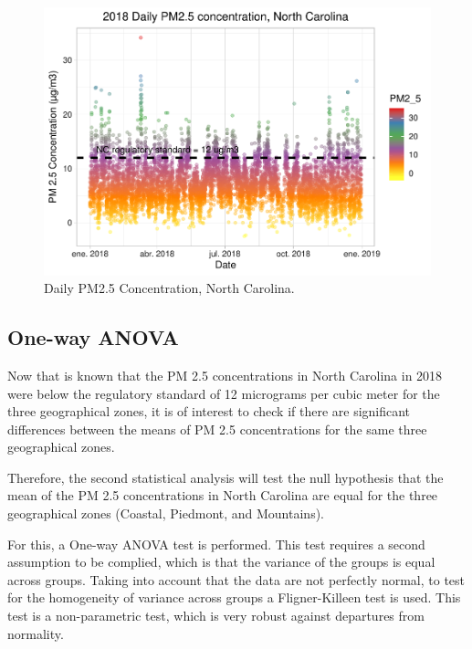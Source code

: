 \documentclass[12pt,]{article}
\newenvironment{Shaded}{\begin{snugshade}}{\end{snugshade}}
\newcommand{\KeywordTok}[1]{\textcolor[rgb]{0.13,0.29,0.53}{\textbf{#1}}}
\newcommand{\DecValTok}[1]{\textcolor[rgb]{0.00,0.00,0.81}{#1}}
\newcommand{\StringTok}[1]{\textcolor[rgb]{0.31,0.60,0.02}{#1}}
\newcommand{\OperatorTok}[1]{\textcolor[rgb]{0.81,0.36,0.00}{\textbf{#1}}}
\newcommand{\NormalTok}[1]{#1}
\begin{document}
\begin{figure}
\centering
\includegraphics{Raby_ENV872_Project_files/figure-latex/unnamed-chunk-51-1.pdf}
\caption{Daily PM2.5 Concentration, North Carolina.
\label{PM2.5Standardplot}}
\end{figure}

\subsection{One-way ANOVA}\label{one-way-anova}

Now that is known that the PM 2.5 concentrations in North Carolina in
2018 were below the regulatory standard of 12 micrograms per cubic meter
for the three geographical zones, it is of interest to check if there
are significant differences between the means of PM 2.5 concentrations
for the same three geographical zones.

Therefore, the second statistical analysis will test the null hypothesis
that the mean of the PM 2.5 concentrations in North Carolina are equal
for the three geographical zones (Coastal, Piedmont, and Mountains).

For this, a One-way ANOVA test is performed. This test requires a second
assumption to be complied, which is that the variance of the groups is
equal across groups. Taking into account that the data are not perfectly
normal, to test for the homogeneity of variance across groups a
Fligner-Killeen test is used. This test is a non-parametric test, which
is very robust against departures from normality.

\begin{Shaded}
\end{Shaded}
\end{document}
